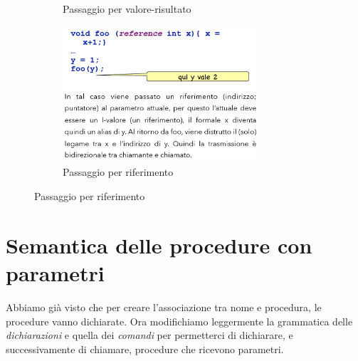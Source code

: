 \documentclass[a4paper,oneside,titlepage]{book}
\begin{document}
\begin{figure}[htp]
\begin{subfigure}{0.49\textwidth}
		\caption{Passaggio per valore-risultato}
	\end{subfigure}
	\begin{subfigure}{0.49\textwidth}
		\centering
		\includegraphics[width=0.8\textwidth, height=0.8\textheight, keepaspectratio]{rif.png}
		\caption{Passaggio per riferimento}
	\end{subfigure}
\end{figure}

\section{Semantica delle procedure con parametri}
Abbiamo già visto che per creare l'associazione tra nome e procedura, le procedure vanno dichiarate. Ora modifichiamo leggermente la grammatica delle \textit{dichiarazioni} e quella dei \textit{comandi} per permetterci di dichiarare, e successivamente di chiamare, procedure che ricevono parametri.
\end{document}
